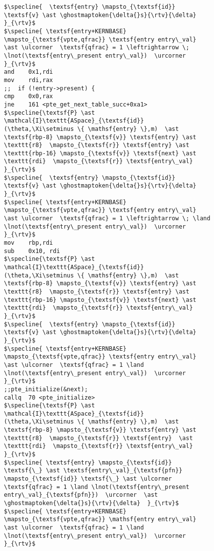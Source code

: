 \begin{figure}
\begin{lstlisting}[mathescape, basicstyle=\tiny]
$\specline{  \textsf{entry} \mapsto_{\textsf{id}} \textsf{v} \ast \ghostmaptoken{\delta{}s}{\rtv}{\delta}  }_{\rtv}$
$\specline{ \textsf{entry+KERNBASE} \mapsto_{\textsf{vpte,qfrac}} \textsf{entry entry\_val} \ast \ulcorner  \textsf{qfrac} = 1 \leftrightarrow \; \lnot(\textsf{entry\_present entry\_val})  \urcorner }_{\rtv}$
and    0x1,rdi
mov    rdi,rax
;;  if (!entry->present) {
cmp    0x0,rax
jne    161 <pte_get_next_table_succ+0xa1>
$\specline{\textsf{P} \ast \mathcal{I}\texttt{ASpace}_{\textsf{id}}(\theta,\Xi\setminus \{ \mathsf{entry} \},m)  \ast \textsf{rbp-8} \mapsto_{\textsf{v}} \textsf{entry} \ast \texttt{r8}  \mapsto_{\textsf{r}} \textsf{entry} \ast \texttt{rbp-16} \mapsto_{\textsf{v}} \textsf{next} \ast \texttt{rdi}  \mapsto_{\textsf{r}} \textsf{entry\_val} }_{\rtv}$
$\specline{  \textsf{entry} \mapsto_{\textsf{id}} \textsf{v} \ast \ghostmaptoken{\delta{}s}{\rtv}{\delta}  }_{\rtv}$
$\specline{ \textsf{entry+KERNBASE} \mapsto_{\textsf{vpte,qfrac}} \textsf{entry entry\_val} \ast \ulcorner  \textsf{qfrac} = 1 \leftrightarrow \; \land \lnot(\textsf{entry\_present entry\_val})  \urcorner }_{\rtv}$
mov    rbp,rdi
sub    0x10, rdi
$\specline{\textsf{P} \ast \mathcal{I}\texttt{ASpace}_{\textsf{id}}(\theta,\Xi\setminus \{ \mathsf{entry} \},m)  \ast \textsf{rbp-8} \mapsto_{\textsf{v}} \textsf{entry} \ast \texttt{r8}  \mapsto_{\textsf{r}} \textsf{entry} \ast \texttt{rbp-16} \mapsto_{\textsf{v}} \textsf{next} \ast \texttt{rdi}  \mapsto_{\textsf{r}} \textsf{entry\_val}  }_{\rtv}$
$\specline{  \textsf{entry} \mapsto_{\textsf{id}} \textsf{v} \ast \ghostmaptoken{\delta{}s}{\rtv}{\delta} }_{\rtv}$
$\specline{ \textsf{entry+KERNBASE} \mapsto_{\textsf{vpte,qfrac}} \textsf{entry entry\_val} \ast \ulcorner  \textsf{qfrac} = 1 \land \lnot(\textsf{entry\_present entry\_val})  \urcorner }_{\rtv}$
;;pte_initialize(&next);
callq  70 <pte_initialize>
$\specline{\textsf{P} \ast \mathcal{I}\texttt{ASpace}_{\textsf{id}}(\theta,\Xi\setminus \{ \mathsf{entry} \},m)  \ast \textsf{rbp-8} \mapsto_{\textsf{v}} \textsf{entry} \ast \texttt{r8}  \mapsto_{\textsf{r}} \textsf{entry}  \ast \texttt{rdi}  \mapsto_{\textsf{r}} \textsf{entry\_val}  }_{\rtv}$
$\specline{ \textsf{entry} \mapsto_{\textsf{id}} \textsf{\_} \ast \textsf{entry\_val}_{\textsf{pfn}} \mapsto_{\textsf{id}} \textsf{\_} \ast \ulcorner  \textsf{qfrac} = 1 \land \lnot(\textsf{entry\_present entry\_val}_{\textsf{pfn}})  \urcorner  \ast \ghostmaptoken{\delta{}s}{\rtv}{\delta}  }_{\rtv}$
$\specline{ \textsf{entry+KERNBASE} \mapsto_{\textsf{vpte,qfrac}} \mathsf{entry entry\_val} \ast \ulcorner  \textsf{qfrac} = 1 \land \lnot(\textsf{entry\_present entry\_val})  \urcorner }_{\rtv}$

\end{lstlisting}
\end{figure}
